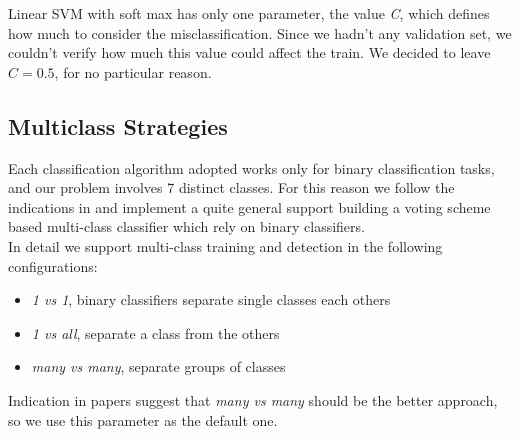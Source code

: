 Linear SVM with soft max has only one parameter, the value \emph{C}, which
defines how much to consider the misclassification. Since we hadn't any
validation set, we couldn't verify how much this value could affect the train.
We decided to leave $C=0.5$, for no particular reason.

\subsection{Multiclass Strategies}

Each classification algorithm adopted works only for binary classification tasks, and our problem involves 7 distinct classes. For this reason we follow the indications in \cite{Littlewort04dynamicsof, Bartlett06fullyautomatic} and implement a quite general support building a voting scheme based multi-class classifier which rely on binary classifiers.\\
In detail we support multi-class training and detection in the following configurations:

\begin{itemize}
\item \emph{1 vs 1}, binary classifiers separate single classes each others
\item \emph{1 vs all}, separate a class from the others
\item \emph{many vs many}, separate groups of classes
\end{itemize}

Indication in papers suggest that \emph{many vs many} should be the better approach, so we use this parameter as the default one.
\newpage
